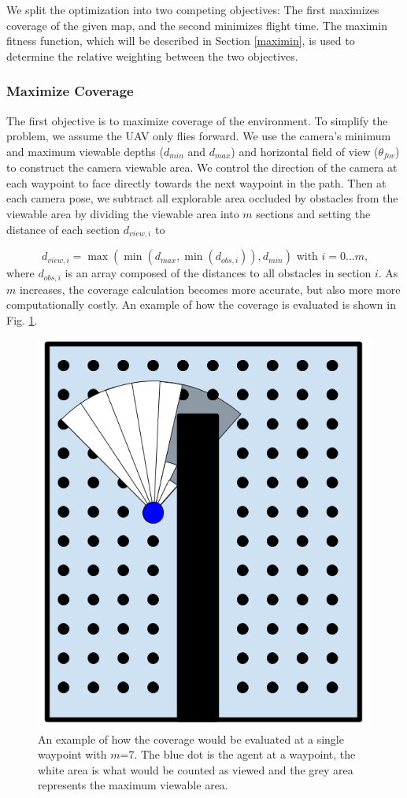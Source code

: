 \documentclass[letterpaper, 10 pt, conference]{ieeeconf}  %
\begin{document}
We split the optimization into two competing objectives: The first maximizes coverage of the given map, and the second minimizes flight time. The maximin fitness function, which will be described in Section \ref{maximin}, is used to determine the relative weighting between the two objectives.

\subsubsection{Maximize Coverage}

The first objective is to maximize coverage of the environment.  To simplify the problem, we assume the UAV only flies forward. We use the camera's minimum and maximum viewable depths ($d_{\mathit{min}}$ and $d_{\mathit{max}}$) and horizontal field of view ($\theta_{\mathit{fov}}$) to construct the camera viewable area. We control the direction of the camera at each waypoint to face directly towards the next waypoint in the path. Then at each camera pose, we subtract all explorable area occluded by obstacles from the viewable area by dividing the viewable area into $m$ sections and setting the distance of each section $d_{\mathit{view},i}$ to

\begin{equation}
  d_{\mathit{view},i} = \max(\min(d_{\mathit{max}}, \min(d_{\mathit{obs},i})),d_{\mathit{min}}) \text{ with } i = 0...m \text{,}
\end{equation}
%
where $d_{\mathit{obs},i}$ is an array composed of the distances to all obstacles in section $i$. As $m$ increases, the coverage calculation becomes more accurate, but also more more computationally costly. An example of how the coverage is evaluated is shown in Fig. \ref{fig:coverage_sections}.

\begin{figure}
\centering
\includegraphics[width=0.5\linewidth]{coverage_sections.png}
\caption[An example of coverage evaluation in the coverage planner.]{An example of how the coverage would be evaluated at a single waypoint with $m$=7. The blue dot is the agent at a waypoint, the white area is what would be counted as viewed and the grey area represents the maximum viewable area.}
\label{fig:coverage_sections}
\end{figure}
\end{document}

